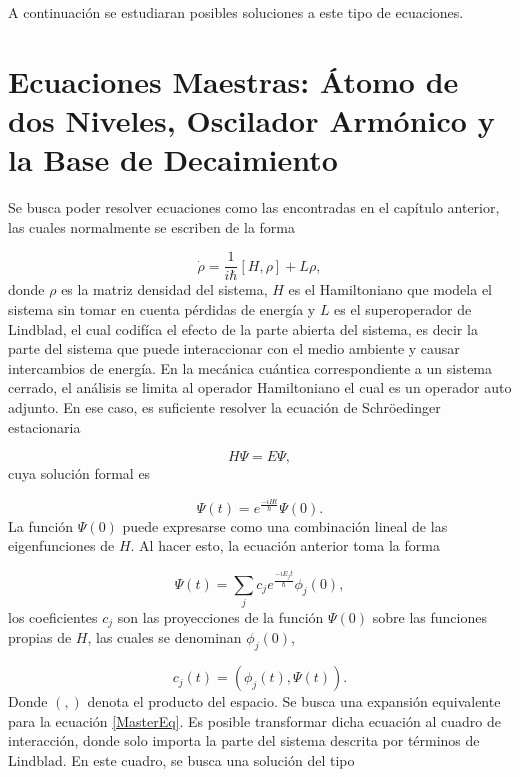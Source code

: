 \documentclass[a4paper,10pt]{report}
\begin{document}
A continuación se estudiaran posibles soluciones a este tipo de ecuaciones.


\chapter{Ecuaciones Maestras: Átomo de dos Niveles, Oscilador Armónico y la Base de Decaimiento}

Se busca poder resolver ecuaciones como las encontradas en el capítulo anterior, las cuales normalmente se escriben de la forma

\begin{equation}\label{MasterEq}
\dot{\rho} = \frac{1}{i\hbar}[H,\rho] + L\rho,
\end{equation} donde $\rho$ es la matriz densidad del sistema, $H$ es el Hamiltoniano que modela el sistema sin tomar en cuenta pérdidas de energía y $L$ es el superoperador de Lindblad, el cual codifíca el efecto de la parte abierta del sistema, es decir la parte del sistema que puede interaccionar con el medio ambiente y causar intercambios de energía. En la mecánica cuántica correspondiente a un sistema cerrado, el análisis se limita al operador Hamiltoniano el cual es un operador auto adjunto. En ese caso, es suficiente resolver la ecuación de Schröedinger estacionaria

\begin{equation}
H\Psi = E\Psi,
\end{equation} cuya solución formal es

\begin{equation}
\Psi(t) = e^{\frac{-iHt}{\hbar}}\Psi(0).
\end{equation} La función $\Psi(0)$ puede expresarse como una  combinación lineal de las eigenfunciones de $H$. Al hacer esto, la ecuación anterior toma la forma

\begin{equation}
\Psi(t) = \sum_j c_j e^{\frac{-iE_jt}{\hbar}}\phi_j(0),
\end{equation}los coeficientes $c_j$ son las proyecciones de la función $\Psi(0)$ sobre las funciones propias de $H$, las cuales se denominan $\phi_j(0)$,

\begin{equation}
c_j(t)= (\phi_j(t),\Psi(t)).
\end{equation}Donde $(,)$ denota el producto del espacio. Se busca una expansión equivalente para la ecuación \eqref{MasterEq}. Es posible transformar dicha ecuación al cuadro de interacción, donde solo importa la parte del sistema descrita por términos de Lindblad. En este cuadro, se busca una solución del tipo
\end{document}
